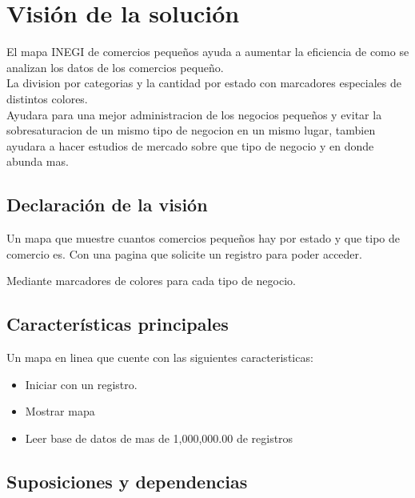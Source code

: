\documentclass[12pt]{article}
\begin{document}
\newpage
\maketitle

\newpage \tableofcontents

\newpage \section{Visión de la solución}

El mapa INEGI de comercios pequeños ayuda a aumentar la eficiencia de como se analizan los datos de los comercios pequeño.\\

La division por categorias y la cantidad por estado con marcadores especiales de distintos colores.\\

Ayudara para una mejor administracion de los negocios pequeños y evitar la sobresaturacion de un mismo tipo de negocion en un mismo lugar, tambien ayudara a hacer estudios de mercado sobre que tipo de negocio y en donde abunda mas.
 
\subsection{Declaración de la visión}\label{ant}

Un mapa que muestre cuantos comercios pequeños hay por estado y que tipo de comercio es. Con una 
pagina que solicite un registro para poder acceder.

Mediante marcadores de colores para cada tipo de negocio.

\subsection{Características principales}\label{on}

Un mapa en linea que cuente con las siguientes caracteristicas:
\begin{itemize}

\item Iniciar con un registro.        
\item Mostrar mapa 
\item Leer base de datos de mas de 1,000,000.00 de registros

\end{itemize}

\subsection{Suposiciones y dependencias}\label{occe}
\end{document}
